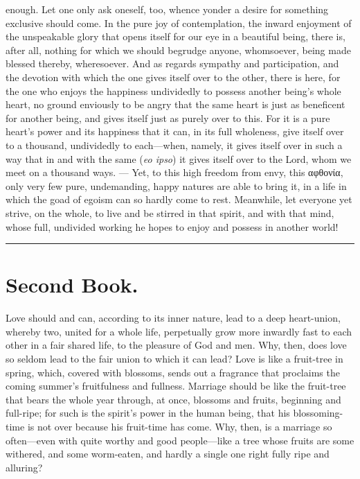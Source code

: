 \documentclass[12pt,a4paper]{book}
\begin{document}
enough. Let one only ask oneself, too, whence yonder a desire for something
exclusive should come. In the pure joy of contemplation, the inward
enjoyment of the unspeakable glory that opens itself for our eye in a
beautiful being, there is, after all, nothing for which we should begrudge
anyone, whomsoever, being made blessed thereby, wheresoever. And as regards
sympathy and participation, and the devotion with which the one gives
itself over to the other, there is here, for the one who enjoys the
happiness undividedly to possess another being's whole heart, no ground
enviously to be angry that the same heart is just as beneficent for another
being, and gives itself just as purely over to this. For it is a pure
heart's power and its happiness that it can, in its full wholeness, give
itself over to a thousand, undividedly to each---when, namely, it gives
itself over in such a way that in and with the same (\textit{eo ipso}) it
gives itself over to the Lord, whom we meet on a thousand ways. --- Yet, to
this high freedom from envy, this αφθονία, only very few pure, undemanding,
happy natures are able to bring it, in a life in which the goad of egoism
can so hardly come to rest. Meanwhile, let everyone yet strive, on the
whole, to live and be stirred in that spirit, and with that mind, whose
full, undivided working he hopes to enjoy and possess in another world!

\begin{center}\rule{0.28\linewidth}{0.4pt}\end{center}

\chapter*{Second Book.}

Love should and can, according to its inner nature, lead to a deep
heart-union, whereby two, united for a whole life, perpetually grow more
inwardly fast to each other in a fair shared life, to the pleasure of God
and men. Why, then, does love so seldom lead to the fair union to which it
can lead? Love is like a fruit-tree in spring, which, covered with
blossoms, sends out a fragrance that proclaims the coming summer's
fruitfulness and fullness. Marriage should be like the fruit-tree that
bears the whole year through, at once, blossoms and fruits, beginning and
full-ripe; for such is the spirit's power in the human being, that his
blossoming-time is not over because his fruit-time has come. Why, then, is
a marriage so often---even with quite worthy and good people---like a tree
whose fruits are some withered, and some worm-eaten, and hardly a single
one right fully ripe and alluring?
\end{document}
